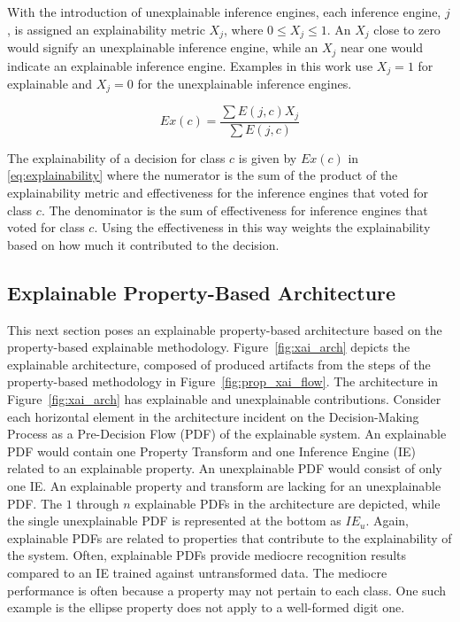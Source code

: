 With the introduction of unexplainable inference engines, each inference engine,
$j$, is assigned an explainability metric $X_j$, where $ 0 \leq X_j \leq 1$. An
$X_j$ close to zero would signify an unexplainable inference engine, while an
$X_j$ near one would indicate an explainable inference engine. Examples in this
work use $X_j=1$ for explainable and $X_j=0$ for the unexplainable inference
engines.

\begin{equation}\label{eq:explainability}
Ex(c)=\frac{\sum{E(j,c)X_j}}{\sum{E(j,c)}}
\end{equation}

The explainability of a decision for class $c$ is given by $Ex(c)$ in
\eqref{eq:explainability} where the numerator is the sum of the product of the
explainability metric and effectiveness for the inference engines that voted for
class $c$. The denominator is the sum of effectiveness for inference engines
that voted for class $c$. Using the effectiveness in this way weights the
explainability based on how much it contributed to the decision.

\subsection{Explainable Property-Based Architecture}

This next section poses an explainable property-based architecture based on the
property-based explainable methodology. Figure~\ref{fig:xai_arch} depicts the
explainable architecture, composed of produced artifacts from the steps of the
property-based methodology in Figure~\ref{fig:prop_xai_flow}. The architecture
in Figure~\ref{fig:xai_arch} has explainable and unexplainable contributions.
Consider each horizontal element in the architecture incident on the
Decision-Making Process as a Pre-Decision Flow (PDF) of the explainable system.
An explainable PDF would contain one Property Transform and one Inference Engine
(IE) related to an explainable property. An unexplainable PDF would consist of
only one IE.  An explainable property and transform are lacking for an
unexplainable PDF. The $1$ through $n$ explainable PDFs in the architecture are
depicted, while the single unexplainable PDF is represented at the bottom as
$IE_u$. Again, explainable PDFs are related to properties that contribute to the
explainability of the system. Often, explainable PDFs provide mediocre
recognition results compared to an IE trained against untransformed data. The
mediocre performance is often because a property may not pertain to each class.
One such example is the ellipse property does not apply to a well-formed digit
one.

